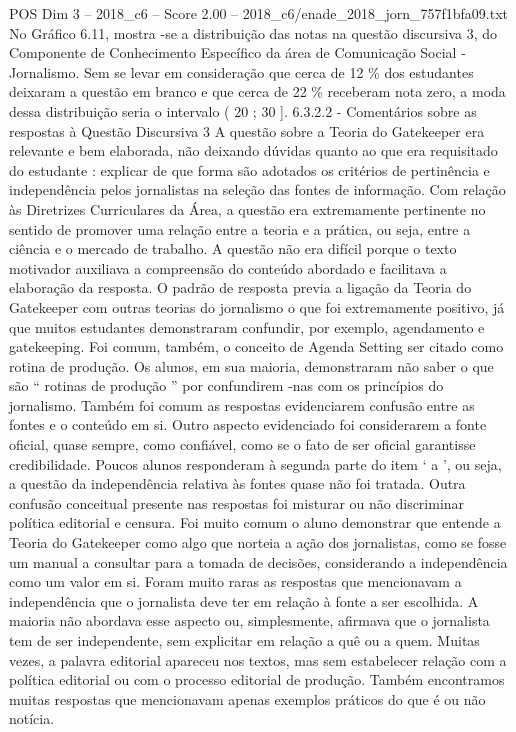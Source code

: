 \begin{textsample}{POS Dim 3 – 2018\_c6 – Score 2.00 – 2018\_c6/enade\_2018\_jorn\_757f1bfa09.txt}
No Gráfico 6.11, mostra -se a distribuição das notas na questão discursiva 3, do Componente de Conhecimento Específico da área de Comunicação Social - Jornalismo.
Sem se levar em consideração que cerca de 12 \% dos estudantes deixaram a questão em branco e que cerca de 22 \% receberam nota zero, a moda dessa distribuição seria o intervalo ( 20 ; 30 ]. 6.3.2.2 - Comentários sobre as respostas à Questão Discursiva 3 A questão sobre a Teoria do Gatekeeper era relevante e bem elaborada, não deixando dúvidas quanto ao que era requisitado do estudante : explicar de que forma são adotados os critérios de pertinência e independência pelos jornalistas na seleção das fontes de informação.
Com relação às Diretrizes Curriculares da Área, a questão era extremamente pertinente no sentido de promover uma relação entre a teoria e a prática, ou seja, entre a ciência e o mercado de trabalho.
A questão não era difícil porque o texto motivador auxiliava a compreensão do conteúdo abordado e facilitava a elaboração da resposta.
O padrão de resposta previa a ligação da Teoria do Gatekeeper com outras teorias do jornalismo o que foi extremamente positivo, já que muitos estudantes demonstraram confundir, por exemplo, agendamento e gatekeeping.
Foi comum, também, o conceito de Agenda Setting ser citado como rotina de produção.
Os alunos, em sua maioria, demonstraram não saber o que são “ rotinas de produção ” por confundirem -nas com os princípios do jornalismo.
Também foi comum as respostas evidenciarem confusão entre as fontes e o conteúdo em si.
Outro aspecto evidenciado foi considerarem a fonte oficial, quase sempre, como confiável, como se o fato de ser oficial garantisse credibilidade.
Poucos alunos responderam à segunda parte do item ‘ a ’, ou seja, a questão da independência relativa às fontes quase não foi tratada.
Outra confusão conceitual presente nas respostas foi misturar ou não discriminar política editorial e censura.
Foi muito comum o aluno demonstrar que entende a Teoria do Gatekeeper como algo que norteia a ação dos jornalistas, como se fosse um manual a consultar para a tomada de decisões, considerando a independência como um valor em si.
Foram muito raras as respostas que mencionavam a independência que o jornalista deve ter em relação à fonte a ser escolhida.
A maioria não abordava esse aspecto ou, simplesmente, afirmava que o jornalista tem de ser independente, sem explicitar em relação a quê ou a quem.
Muitas vezes, a palavra editorial apareceu nos textos, mas sem estabelecer relação com a política editorial ou com o processo editorial de produção.
Também encontramos muitas respostas que mencionavam apenas exemplos práticos do que é ou não notícia.

\end{textsample}
